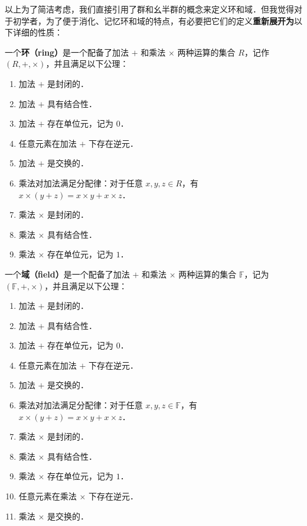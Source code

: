 以上为了简洁考虑，我们直接引用了群和幺半群的概念来定义环和域．但我觉得对于初学者，为了便于消化、记忆环和域的特点，有必要把它们的定义\textbf{重新展开为}以下详细的性质：

\begin{definition}{}
一个\textbf{环（ring）}是一个配备了加法 $+$ 和乘法 $\times$ 两种运算的集合 $R$，记作 $(R, +, \times)$，并且满足以下公理：
\begin{enumerate}
    \item 加法 $+$ 是封闭的．
    \item 加法 $+$ 具有结合性．
    \item 加法 $+$ 存在单位元，记为 $0$．
    \item 任意元素在加法 $+$ 下存在逆元．
    \item 加法 $+$ 是交换的．
    \item 乘法对加法满足分配律：对于任意 $x, y, z\in R$，有 $x\times(y+z)=x\times y+x\times z$．
    \item 乘法 $\times$ 是封闭的．
    \item 乘法 $\times$ 具有结合性．
    \item 乘法 $\times$ 存在单位元，记为 $1$．
\end{enumerate}
\end{definition}

\begin{definition}{}
一个\textbf{域（field）}是一个配备了加法 $+$ 和乘法 $\times$ 两种运算的集合 $\mathbb{F}$，记为 $(\mathbb{F}, +, \times)$，并且满足以下公理：

\begin{enumerate}
    \item 加法 $+$ 是封闭的．
    \item 加法 $+$ 具有结合性．
    \item 加法 $+$ 存在单位元，记为 $0$．
    \item 任意元素在加法 $+$ 下存在逆元．
    \item 加法 $+$ 是交换的．
    \item 乘法对加法满足分配律：对于任意 $x, y, z\in \mathbb{F}$，有 $x\times(y+z)=x\times y+x\times z$．
    \item 乘法 $\times$ 是封闭的．
    \item 乘法 $\times$ 具有结合性．
    \item 乘法 $\times$ 存在单位元，记为 $1$．
    \item 任意元素在乘法 $\times$ 下存在逆元．
    \item 乘法 $\times$ 是交换的．
\end{enumerate}
\end{definition}

